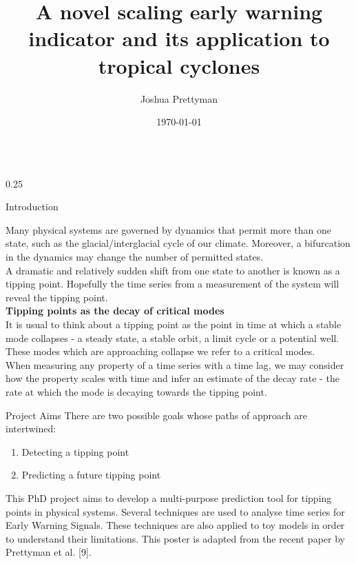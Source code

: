\documentclass[10pt, final]{beamer}
\title[I like to make posters]{A novel scaling early warning indicator and its application to tropical cyclones}
\author[T]{Joshua Prettyman}
\institute[SMS]{University of Reading\\ National Physical Laboratory}
\date{\today}
\begin{document}
\begin{frame}{} 
  \begin{columns}[T]
    \begin{column}{0.25\textwidth}
    		\begin{block}{Introduction}
    		
    		Many physical systems are governed by dynamics that permit more than one state, such as the glacial/interglacial cycle of our climate. Moreover, a bifurcation in the dynamics may change the number of permitted states. \\
    		\vspace{0.5cm}
    		A dramatic and relatively sudden shift from one state to another is known as a tipping point. Hopefully the time series from a measurement of the system will reveal the tipping point. \\
    		\vspace{0.5cm}
		{\Large\bf Tipping points as the decay of critical modes}\\
		
	
		It is usual to think about a tipping point as the point in time at which a stable mode collapses - a steady state, a stable orbit, a limit cycle or a potential well. These modes which are approaching collapse we refer to a critical modes. \\
    		\vspace{0.5cm}		
		When measuring any property of a time series with a time lag, we may consider how the property scales with time and infer an estimate of the decay rate - the rate at which the mode is decaying towards the tipping point. 
		
		    
    		\end{block}
    		
    		\begin{block}{Project Aims}
    		There are two possible goals whose paths of approach are intertwined:
    		\vspace{0.5cm}
    			\begin{enumerate}
    			\setlength{\itemindent}{3em}
    			\item Detecting a tipping point
    			\item Predicting a future tipping point
    			\end{enumerate}
    		\vspace{1cm}
    		This PhD project aims to develop a multi-purpose prediction tool for tipping points in physical systems. Several techniques are used to analyse time series for Early Warning Signals.	 These techniques are also applied to toy models in order to understand their limitations. This poster is adapted from the recent paper by Prettyman et al. [9].
    		\end{block}  
    			

\end{column}
\end{columns}
\end{frame}
\end{document}

